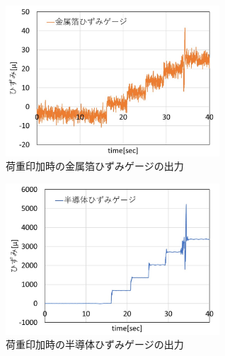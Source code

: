 \begin{figure}[h]
  \begin{center}
    \includegraphics[width=8.0cm]{pic/kinkekka.jpg}
    \caption{荷重印加時の金属箔ひずみゲージの出力}\label{fig:kinkeka}
  \end{center}
\end{figure}

\begin{figure}[h]
  \begin{center}
    \includegraphics[width=8.0cm]{pic/hankekka.jpg}
    \caption{荷重印加時の半導体ひずみゲージの出力}\label{fig:hankekka}
  \end{center}
\end{figure}